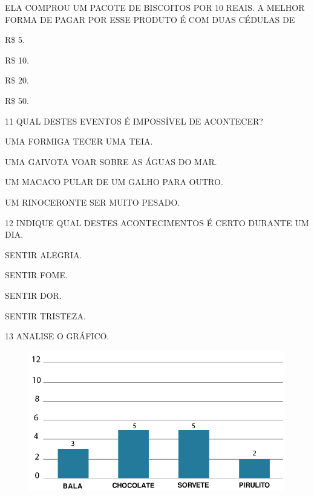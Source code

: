 ELA COMPROU UM PACOTE DE BISCOITOS POR 10 REAIS. A MELHOR
FORMA DE PAGAR POR ESSE PRODUTO É COM DUAS CÉDULAS DE

\begin{multicols}{4}
\begin{escolha}
\item R\$ 5.

\item R\$ 10.

\item R\$ 20.

\item R\$ 50.
\end{escolha}
\end{multicols}

\vspace{0.5cm}

\num{11} QUAL DESTES EVENTOS É IMPOSSÍVEL DE ACONTECER?

\begin{escolha}
\item UMA FORMIGA TECER UMA TEIA.

\item UMA GAIVOTA VOAR SOBRE AS ÁGUAS DO MAR.

\item UM MACACO PULAR DE UM GALHO PARA OUTRO.

\item UM RINOCERONTE SER MUITO PESADO.
\end{escolha}

\num{12} INDIQUE QUAL DESTES ACONTECIMENTOS É CERTO DURANTE UM DIA.

\begin{escolha}
\item SENTIR ALEGRIA.

\item SENTIR FOME.

\item SENTIR DOR.

\item SENTIR TRISTEZA.
\end{escolha}

\num{13} ANALISE O GRÁFICO.

\begin{figure}[H]
\includegraphics[width=\textwidth]{./media/SAEB_1ANO_MAT_FIGURA118.png}
\end{figure}

